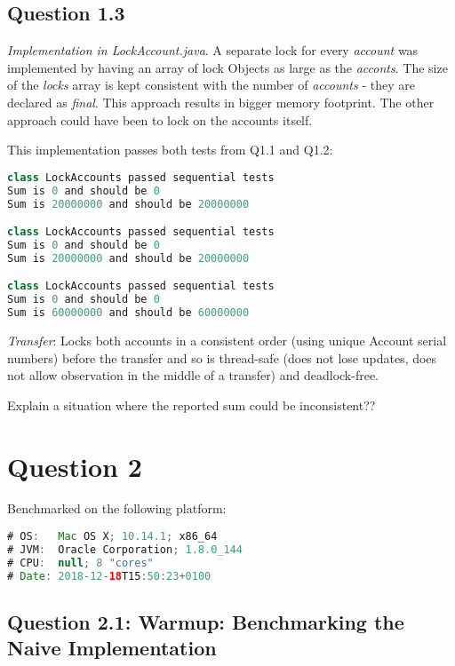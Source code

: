 \documentclass[format=acmsmall, review=false, screen=true]{acmart}
\begin{document}
\subsection{Question 1.3}

\textit{Implementation in LockAccount.java}. A separate lock for every \emph{account} was implemented by having an array of lock Objects as large as the \emph{acconts}. The size of the \emph{locks} array is kept consistent with the number of \emph{accounts} - they are declared as \emph{final}. This approach results in bigger memory footprint. The other approach could have been to lock on the accounts itself.

This implementation passes both tests from Q1.1 and Q1.2:

\begin{lstlisting}[language=java]
class LockAccounts passed sequential tests
Sum is 0 and should be 0
Sum is 20000000 and should be 20000000

class LockAccounts passed sequential tests
Sum is 0 and should be 0
Sum is 20000000 and should be 20000000

class LockAccounts passed sequential tests
Sum is 0 and should be 0
Sum is 60000000 and should be 60000000
\end{lstlisting}

\emph{Transfer}: Locks both accounts in a consistent order (using unique Account serial numbers) before the transfer and so is thread-safe (does not lose updates, does not allow observation in the middle of a transfer) and deadlock-free.

Explain a situation where the reported sum could be inconsistent??

\section{Question 2}

Benchmarked on the following platform:

\begin{lstlisting}[language=java]
# OS:   Mac OS X; 10.14.1; x86_64
# JVM:  Oracle Corporation; 1.8.0_144
# CPU:  null; 8 "cores"
# Date: 2018-12-18T15:50:23+0100
\end{lstlisting}

\subsection{Question 2.1: Warmup: Benchmarking the Naive Implementation}
\end{document}
